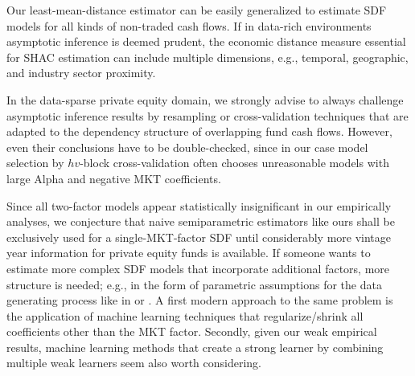 \documentclass[12pt]{article}
\begin{document}
Our least-mean-distance estimator can be easily generalized to estimate SDF models for all kinds of non-traded cash flows.
If in data-rich environments asymptotic inference is deemed prudent, the economic distance measure essential for SHAC estimation can include multiple dimensions, e.g., temporal, geographic, and industry sector proximity.

In the data-sparse private equity domain, we strongly advise to always challenge asymptotic inference results by resampling or cross-validation techniques that are adapted to the dependency structure of overlapping fund cash flows.
However, even their conclusions have to be double-checked, since in our case model selection by $hv$-block cross-validation often chooses unreasonable models with large Alpha and negative MKT coefficients.

Since all two-factor models appear statistically insignificant in our empirically analyses, we conjecture that naive semiparametric estimators like ours shall be exclusively used for a single-MKT-factor SDF until considerably more vintage year information for private equity funds is available.
If someone wants to estimate more complex SDF models that incorporate additional factors, more structure is needed; e.g., in the form of parametric assumptions for the data generating process like in \cite{ACGP18} or \cite{GSW19}.
A first modern approach to the same problem is the application of machine learning techniques that regularize/shrink all coefficients other than the MKT factor.
Secondly, given our weak empirical results, machine learning methods that create a strong learner by combining multiple weak learners seem also worth considering.










\newpage
\end{document}
